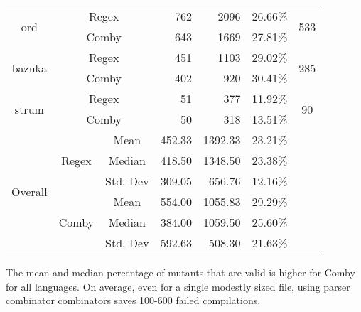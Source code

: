 \documentclass[sigconf,review, anonymous]{acmart}
\begin{document}
{\begin{table}[hbtp]
{\begin{tabular}{|c|c|c|r|r|r|c|}
\multirow{2}{*}{ord} & \multicolumn{2}{c|}{Regex} & 762 \hspace{8pt}	& 2096 \hspace{8pt} & 26.66\% & \multirow{2}{*}{533}\\\cline{2-6}
    & \multicolumn{2}{c|}{Comby} & 643 \hspace{8pt} & 1669 \hspace{8pt} & 27.81\% & \\ \hline
\multirow{2}{*}{bazuka} & \multicolumn{2}{c|}{Regex} & 451 \hspace{8pt} & 1103 \hspace{8pt} & 29.02\% & \multirow{2}{*}{285}\\\cline{2-6}
    & \multicolumn{2}{c|}{Comby} & 402 \hspace{8pt} & 920 \hspace{8pt} & 30.41\% & \\ \hline
\multirow{2}{*}{strum} & \multicolumn{2}{c|}{Regex} & 51 \hspace{8pt} & 377 \hspace{8pt}	& 11.92\% & \multirow{2}{*}{90}\\\cline{2-6}
    & \multicolumn{2}{c|}{Comby} & 50 \hspace{8pt} & 318 \hspace{8pt}	& 13.51\% & \\ \hline

\multirow{6}{*}{Overall} & \multirow{3}{*}{Regex} & Mean & 452.33 & 1392.33	& 23.21\% & \\\cline{3-6}
    &   &  Median & 418.50 & 1348.50 & 23.38\%  & \\\cline{3-6}
    &   &  Std. Dev & 309.05 & 656.76 & 12.16\%  & \\\cline{2-6}

 & \multirow{3}{*}{Comby} & Mean & 554.00 & 1055.83	& 29.29\% & \\\cline{3-6}
    &   &  Median & 384.00 & 1059.50	& 25.60\%  & \\\cline{3-6}
    &   &  Std. Dev & 592.63 & 508.30 & 21.63\%  & \\\hline


\end{tabular}

}
\end{table}

The mean and median percentage of mutants that are valid is higher for
Comby for all languages.  On average, even for a single modestly sized
file, using parser combinator combinators saves 100-600 failed
compilations.

}
\end{document}
